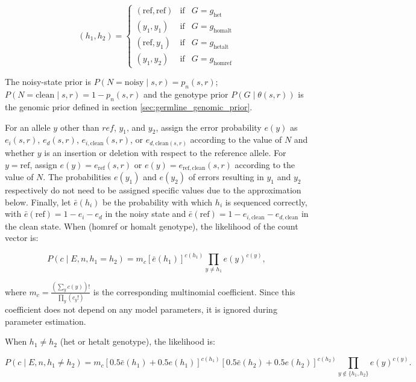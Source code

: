 \documentclass{article}
\begin{document}
\begin{equation*}
(h_1, h_2) = \left\{
\begin{array}{lcl}
(\mathrm{ref},\mathrm{ref}) & \mathrm{if} & G=g_\mathrm{het}\\
(y_1,y_1) & \mathrm{if} & G=g_\mathrm{homalt}\\
(\mathrm{ref},y_1) & \mathrm{if} & G=g_\mathrm{hetalt}\\
(y_1,y_2) & \mathrm{if} & G=g_\mathrm{homref}
\end{array} \right.
\end{equation*}

The noisy-state prior is $P(N=\mathrm{noisy} \mid s,r) = p_n(s,r)$; $P(N=\mathrm{clean} \mid s,r) = 1-p_n(s,r)$ and the genotype prior $P(G \mid \theta(s,r))$ is the genomic prior defined in section \ref{sec:germline_genomic_prior}.

For an allele $y$ other than $ref$, $y_1$, and $y_2$, assign the error probability $e(y)$ as $e_i(s,r)$, $e_d(s,r)$, $e_{i,\mathrm{clean}}(s,r)$, or $e_{d,\mathrm{clean}(s,r)}$ according to the value of $N$ and whether $y$ is an insertion or deletion with respect to the reference allele. For $y=\mathrm{ref}$, assign $e(y) = e_\mathrm{ref}(s,r)$ or $e(y)=e_\mathrm{ref, clean}(s,r)$ according to the value of $N$. The probabilities $e(y_1)$ and $e(y_2)$ of errors resulting in $y_1$ and $y_2$ respectively do not need to be assigned specific values due to the approximation below. Finally, let $\bar{e}(h_i)$ be the probability with which $h_i$ is sequenced correctly, with $\bar{e}(\mathrm{ref}) = 1-e_i-e_d$ in the noisy state and $\bar{e}(\mathrm{ref}) = 1-e_{i,\mathrm{clean}}-e_{d,\mathrm{clean}}$ in the clean state.
When  (homref or homalt genotype), the likelihood of the count vector is:

\begin{equation*}
P(c \mid E, n, h_1=h_2) = m_c [\bar{e}(h_1)]^{c(h_1)} \prod_{y \ne h_1} e(y)^{c(y)},
\end{equation*}

where $m_c = \frac{(\sum_{y}{c(y)})!}{\prod_{y}{(c_y!)}}$ is the corresponding multinomial coefficient. Since this coefficient does not depend on any model parameters, it is ignored during parameter estimation.

When $h_1 \ne h_2$ (het or hetalt genotype), the likelihood is:

\begin{equation*}
P(c \mid E, n, h_1 \ne h_2) = m_c [0.5\bar{e}(h_1) + 0.5e(h_1)]^{c(h_1)} [0.5\bar{e}(h_2) + 0.5e(h_2)]^{c(h_2)} \prod_{y \notin \{h_1, h_2 \}} e(y)^{c(y)}.
\end{equation*}
\end{document}
